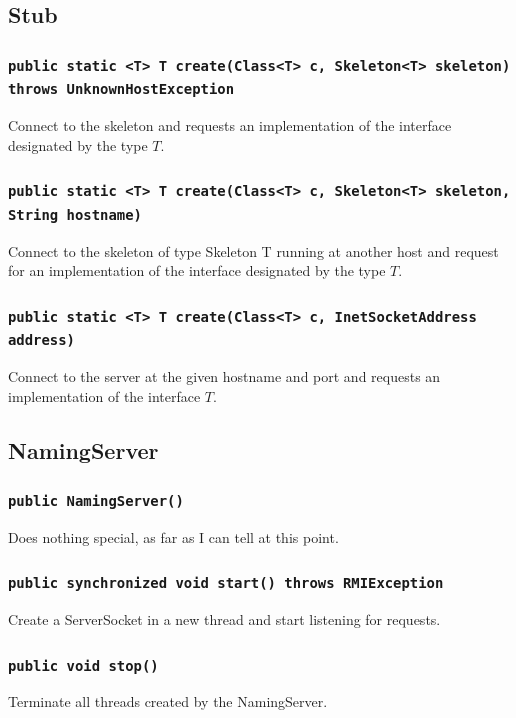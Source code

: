 \documentclass [10pt, a4paper]{article}
\begin{document}
\subsection {Stub}

\subsubsection {\texttt{public static <T> T create(Class<T> c, Skeleton<T>
skeleton) throws UnknownHostException}}
Connect to the skeleton and requests an implementation of the interface
designated by the type $T$.

\subsubsection{\texttt{public static <T> T create(Class<T> c, Skeleton<T>
skeleton, String hostname)}}
Connect to the skeleton of type Skeleton T running at another host and request
for an implementation of the interface designated by the type $T$.

\subsubsection{\texttt{public static <T> T create(Class<T> c, InetSocketAddress
address)}}
Connect to the server at the given hostname and port and requests an
implementation of the interface $T$.

\subsection {NamingServer}

\subsubsection{\texttt{public NamingServer()}}
Does nothing special, as far as I can tell at this point.

\subsubsection{\texttt{public synchronized void start() throws RMIException}}
Create a ServerSocket in a new thread and start listening for requests.

\subsubsection{\texttt{public void stop()}}
Terminate all threads created by the NamingServer.
\end{document}
